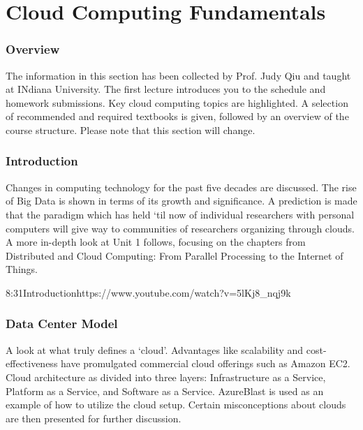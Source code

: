 \part{Cloud Computing Fundamentals}
\label{sec:icloud-fundamentals}

\section{Overview}


The information in this section has been collected by Prof. Judy Qiu
and taught at INdiana University. The first lecture introduces you to the
schedule and homework submissions. Key cloud computing topics are
highlighted. A selection of recommended and required textbooks is given,
followed by an overview of the course structure. Please note that this
section will change.



\section{Introduction}

Changes in computing technology for the past five decades are discussed.
The rise of Big Data is shown in terms of its growth and significance. A
prediction is made that the paradigm which has held `til now of
individual researchers with personal computers will give way to
communities of researchers organizing through clouds. A more in-depth
look at Unit 1 follows, focusing on the chapters from Distributed and
Cloud Computing: From Parallel Processing to the Internet of Things.

  {8:31}{Introduction}{https://www.youtube.com/watch?v=5lKj8_nqj9k}

\section{Data Center Model}

A look at what truly defines a `cloud'. Advantages like scalability and
cost-effectiveness have promulgated commercial cloud offerings such as
Amazon EC2. Cloud architecture as divided into three layers:
Infrastructure as a Service, Platform as a Service, and Software as a
Service. AzureBlast is used as an example of how to utilize the cloud
setup. Certain misconceptions about clouds are then presented for
further discussion.

